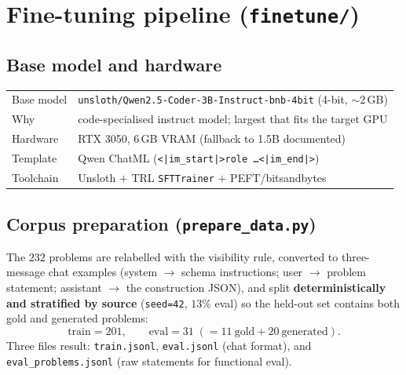 \documentclass[11pt]{article}
\newcommand{\code}[1]{\texttt{\small #1}}
\begin{document}
\section{Fine-tuning pipeline (\texttt{finetune/})}

\subsection{Base model and hardware}
\begin{center}
\begin{tabular}{@{}ll@{}}
\toprule
Base model & \code{unsloth/Qwen2.5-Coder-3B-Instruct-bnb-4bit} (4-bit, $\sim$2\,GB)\\
Why        & code-specialised instruct model; largest that fits the target GPU\\
Hardware   & RTX 3050, $6$\,GB VRAM (fallback to 1.5B documented)\\
Template   & Qwen ChatML (\code{<|im\_start|>role \dots <|im\_end|>})\\
Toolchain  & Unsloth $+$ TRL \code{SFTTrainer} $+$ PEFT/bitsandbytes\\
\bottomrule
\end{tabular}
\end{center}

\subsection{Corpus preparation (\texttt{prepare\_data.py})}
The $232$ problems are relabelled with the visibility rule, converted to
three-message chat examples (system $\to$ schema instructions; user $\to$ problem
statement; assistant $\to$ the construction JSON), and split
\textbf{deterministically and stratified by source} (\code{seed=42},
$13\%$ eval) so the held-out set contains both gold and generated problems:
\[
\text{train} = 201,\qquad \text{eval} = 31\;(=11\ \text{gold} + 20\ \text{generated}).
\]
Three files result: \code{train.jsonl}, \code{eval.jsonl} (chat format), and
\code{eval\_problems.jsonl} (raw statements for functional eval).
\end{document}
